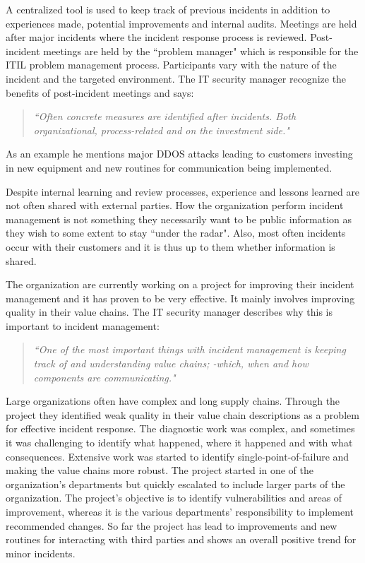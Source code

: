 A centralized tool is used to keep track of previous incidents in addition to experiences made, potential improvements and internal audits. Meetings are held after major incidents where the incident response process is reviewed. Post-incident meetings are held by the ``problem manager" which is responsible for the ITIL problem management process. Participants vary with the nature of the incident and the targeted environment. The IT security manager recognize the benefits of post-incident meetings and says:
\begin{quote}
\textit{``Often concrete measures are identified after incidents. Both organizational, process-related and on the investment side."}
\end{quote}
As an example he mentions major DDOS attacks leading to customers investing in new equipment and new routines for communication being implemented. 

Despite internal learning and review processes, experience and lessons learned are not often shared with external parties. How the organization perform incident management is not something they necessarily want to be public information as they wish to some extent to stay ``under the radar". Also, most often incidents occur with their customers and it is thus up to them whether information is shared. 

The organization are currently working on a project for improving their incident management and it has proven to be very effective. It mainly involves improving quality in their value chains. The IT security manager describes why this is important to incident management:
\begin{quote}
\textit{``One of the most important things with incident management is keeping track of and understanding value chains; -which, when and how components are communicating."}
\end{quote}
Large organizations often have complex and long supply chains. Through the project they identified weak quality in their value chain descriptions as a problem for effective incident response. The diagnostic work was complex, and sometimes it was challenging to identify what happened, where it happened and with what consequences. Extensive work was started to identify single-point-of-failure and making the value chains more robust. The project started in one of the organization's departments but quickly escalated to include larger parts of the organization. The project's objective is to identify vulnerabilities and areas of improvement, whereas it is the various departments' responsibility to implement recommended changes. So far the project has lead to improvements and new routines for interacting with third parties and shows an overall positive trend for minor incidents. 